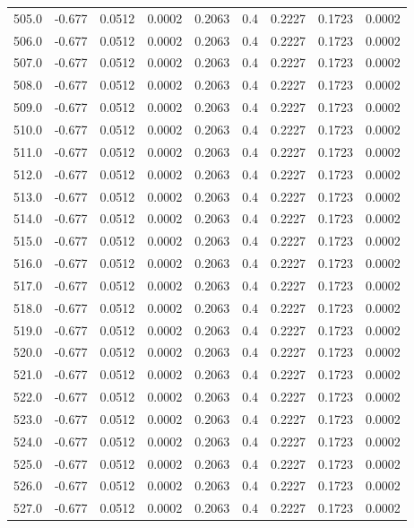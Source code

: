 \begin{longtable}{lrrrrrrrr}
505.0 & -0.677 & 0.0512 & 0.0002 & 0.2063 & 0.4 & 0.2227 & 0.1723 & 0.0002 \\
506.0 & -0.677 & 0.0512 & 0.0002 & 0.2063 & 0.4 & 0.2227 & 0.1723 & 0.0002 \\
507.0 & -0.677 & 0.0512 & 0.0002 & 0.2063 & 0.4 & 0.2227 & 0.1723 & 0.0002 \\
508.0 & -0.677 & 0.0512 & 0.0002 & 0.2063 & 0.4 & 0.2227 & 0.1723 & 0.0002 \\
509.0 & -0.677 & 0.0512 & 0.0002 & 0.2063 & 0.4 & 0.2227 & 0.1723 & 0.0002 \\
510.0 & -0.677 & 0.0512 & 0.0002 & 0.2063 & 0.4 & 0.2227 & 0.1723 & 0.0002 \\
511.0 & -0.677 & 0.0512 & 0.0002 & 0.2063 & 0.4 & 0.2227 & 0.1723 & 0.0002 \\
512.0 & -0.677 & 0.0512 & 0.0002 & 0.2063 & 0.4 & 0.2227 & 0.1723 & 0.0002 \\
513.0 & -0.677 & 0.0512 & 0.0002 & 0.2063 & 0.4 & 0.2227 & 0.1723 & 0.0002 \\
514.0 & -0.677 & 0.0512 & 0.0002 & 0.2063 & 0.4 & 0.2227 & 0.1723 & 0.0002 \\
515.0 & -0.677 & 0.0512 & 0.0002 & 0.2063 & 0.4 & 0.2227 & 0.1723 & 0.0002 \\
516.0 & -0.677 & 0.0512 & 0.0002 & 0.2063 & 0.4 & 0.2227 & 0.1723 & 0.0002 \\
517.0 & -0.677 & 0.0512 & 0.0002 & 0.2063 & 0.4 & 0.2227 & 0.1723 & 0.0002 \\
518.0 & -0.677 & 0.0512 & 0.0002 & 0.2063 & 0.4 & 0.2227 & 0.1723 & 0.0002 \\
519.0 & -0.677 & 0.0512 & 0.0002 & 0.2063 & 0.4 & 0.2227 & 0.1723 & 0.0002 \\
520.0 & -0.677 & 0.0512 & 0.0002 & 0.2063 & 0.4 & 0.2227 & 0.1723 & 0.0002 \\
521.0 & -0.677 & 0.0512 & 0.0002 & 0.2063 & 0.4 & 0.2227 & 0.1723 & 0.0002 \\
522.0 & -0.677 & 0.0512 & 0.0002 & 0.2063 & 0.4 & 0.2227 & 0.1723 & 0.0002 \\
523.0 & -0.677 & 0.0512 & 0.0002 & 0.2063 & 0.4 & 0.2227 & 0.1723 & 0.0002 \\
524.0 & -0.677 & 0.0512 & 0.0002 & 0.2063 & 0.4 & 0.2227 & 0.1723 & 0.0002 \\
525.0 & -0.677 & 0.0512 & 0.0002 & 0.2063 & 0.4 & 0.2227 & 0.1723 & 0.0002 \\
526.0 & -0.677 & 0.0512 & 0.0002 & 0.2063 & 0.4 & 0.2227 & 0.1723 & 0.0002 \\
527.0 & -0.677 & 0.0512 & 0.0002 & 0.2063 & 0.4 & 0.2227 & 0.1723 & 0.0002 \\

\end{longtable}
